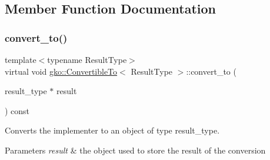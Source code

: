 \subsection{Member Function Documentation}
\mbox{\label{classgko_1_1ConvertibleTo_aa7f3420babcbed39ee15bc020bed4f7e}} 
\subsubsection{\texorpdfstring{convert\+\_\+to()}{convert\_to()}}
{\footnotesize\ttfamily template$<$typename Result\+Type$>$ \\
virtual void \hyperlink{classgko_1_1ConvertibleTo}{gko\+::\+Convertible\+To}$<$ Result\+Type $>$\+::convert\+\_\+to (\begin{DoxyParamCaption}\item[{result\+\_\+type $\ast$}]{result }\end{DoxyParamCaption}) const\hspace{0.3cm}{\ttfamily [pure virtual]}}



Converts the implementer to an object of type result\+\_\+type. 


\begin{DoxyParams}{Parameters}
{\em result} & the object used to store the result of the conversion \\
\hline
\end{DoxyParams}


